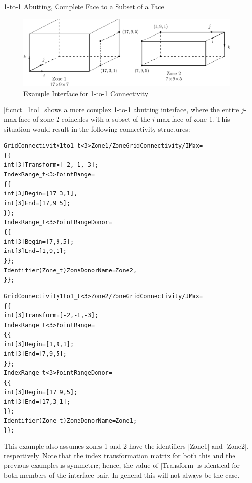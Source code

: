 \begin{example}{1-to-1 Abutting, Complete Face to a Subset of a Face}
\label{ex:1to1b}

\begin{figure}[!htb]
   \centering
   \includegraphics[width=\textwidth]{cnct.figs/cnct_1to1}
   \caption{Example Interface for 1-to-1 Connectivity}
   \label{f:cnct_1to1}
\end{figure}

\autoref{f:cnct_1to1} shows a more complex 1-to-1 abutting interface, where
the entire $j$-max face of zone 2 coincides with a subset of the $i$-max
face of zone 1.
This situation would result in the following connectivity structures:
\begin{alltt}
  GridConnectivity1to1\_t<3> Zone1/ZoneGridConnectivity/IMax =
    \{\{
    int[3] Transform = [-2,-1,-3] ;
    IndexRange\_t<3> PointRange =
      \{\{
      int[3] Begin = [17,3,1] ;
      int[3] End   = [17,9,5] ;
      \}\} ;
    IndexRange\_t<3> PointRangeDonor =
      \{\{
      int[3] Begin = [7,9,5] ; 
      int[3] End   = [1,9,1] ;
      \}\} ;
    Identifier(Zone\_t) ZoneDonorName = Zone2 ;
    \}\} ;
\end{alltt}

\begin{alltt}
  GridConnectivity1to1\_t<3> Zone2/ZoneGridConnectivity/JMax =
    \{\{
    int[3] Transform = [-2,-1,-3] ;
    IndexRange\_t<3> PointRange =
      \{\{
      int[3] Begin = [1,9,1] ;
      int[3] End   = [7,9,5] ;
      \}\} ;
    IndexRange\_t<3> PointRangeDonor =
      \{\{
      int[3] Begin = [17,9,5] ; 
      int[3] End   = [17,3,1] ;
      \}\} ;
    Identifier(Zone\_t) ZoneDonorName = Zone1 ;
    \}\} ;
\end{alltt}
\end{example}
This example also assumes zones 1 and 2 have the identifiers |Zone1| and
|Zone2|, respectively.
Note that the index transformation matrix for both this and the previous
examples is symmetric; hence, the value of |Transform| is identical for
both members of the interface pair.
In general this will not always be the case.

